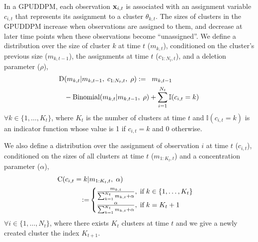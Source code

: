 \documentclass[twocolumn, final]{svjour3}
\begin{document}
In a GPUDDPM, each observation $\bold{x}_{i,t}$ is associated with an assignment variable $c_{i,t}$ that represents its assignment to a cluster $\theta_{k,t}$. 
The sizes of clusters in the GPUDDPM increase when observations are assigned to them, and decrease at later time points when these observations become ``unassigned''. We define a distribution over the size of cluster $k$ at time $t$ ($m_{k,t}$), conditioned on the cluster's previous size ($m_{k,t-1}$), the assignments at time $t$ ($c_{1:N_{t}, t}$), and a deletion parameter ($\rho$),
\begin{equation}
\begin{split}
\label{D_distro}
\text{D} &(m_{k,t} | m_{k,t-1}, \hspace{1mm} c_{1:N_{t}, t}, \hspace{1mm} \rho) := \hspace{2mm} m_{k,t-1} \\
&- \text{Binomial}( m_{k,t} | {m_{k,t-1}, \hspace{1mm} \rho}) + \sum_{i=1}^{N_{t}} \mathbb{I}(c_{i,t} = k)
\end{split}
\end{equation}
$\forall k \in \{1, \ldots, K_{t} \}$, where $K_{t}$ is the number of clusters at time $t$ and $\mathbb{I}(c_{i,t} = k)$ is an indicator function whose value is 1 if $c_{i,t} = k$ and 0 otherwise.

We also define a distribution over the assignment of observation $i$ at time $t$ ($c_{i,t}$), conditioned on the sizes of all clusters at time $t$ ($m_{1:K_{t},t}$) and a concentration parameter ($\alpha$),
\begin{equation}
\begin{split}
\label{C_distro}
\text{C} ( c_{i,t} = k | &m_{1:K_{t},t}, \hspace{1mm} \alpha)\\ :=
& \begin{cases}
\frac{m_{k,t}}{\sum_{k=1}^{K_{t}} m_{k,t} + \alpha}, \hspace{1mm} \text{if} \hspace{1mm} k \in \{ 1, \ldots, K_{t} \} \\
\frac{\alpha}{\sum_{k=1}^{K_{t}} m_{k,t} + \alpha}, \hspace{1mm} \text{if} \hspace{1mm} k = K_{t} + 1
\end{cases}
\end{split}
\end{equation}
$\forall i \in \{1, \ldots, N_{t} \}$, where there exists $K_{t}$ clusters at time $t$ and we give a newly created cluster the index $K_{t+1}$.
\end{document}
